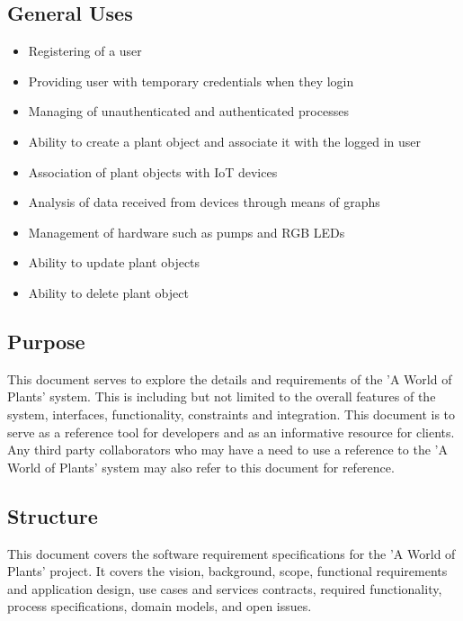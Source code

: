 \documentclass{article}
\begin{document}
	\subsection{General Uses}
		\begin{itemize}
			\item Registering of a user
			\item Providing user with temporary credentials when they login
			\item Managing of unauthenticated and authenticated processes
			\item Ability to create a plant object and associate it with the logged in user
			\item Association of plant objects with IoT devices
			\item Analysis of data received from devices through means of graphs
			\item Management of hardware such as pumps and RGB LEDs
			\item Ability to update plant objects
			\item Ability to delete plant object
		\end{itemize}
	\subsection{Purpose}
		This document serves to explore the details and requirements of the 'A World of Plants' system. This is including
but not limited to the overall features of the system, interfaces, functionality, constraints and integration. This document is to serve as a reference tool for developers and as an informative resource for clients. Any third party collaborators who may have a need to use a reference to the 'A World of Plants' system may also refer to this document for reference.
	\subsection{Structure}
		This document covers the software requirement specifications for the 'A World of Plants' project. It covers the vision, background, scope, functional requirements and application design, use cases and services contracts, required functionality, process specifications, domain models, and open issues.
\end{document}
